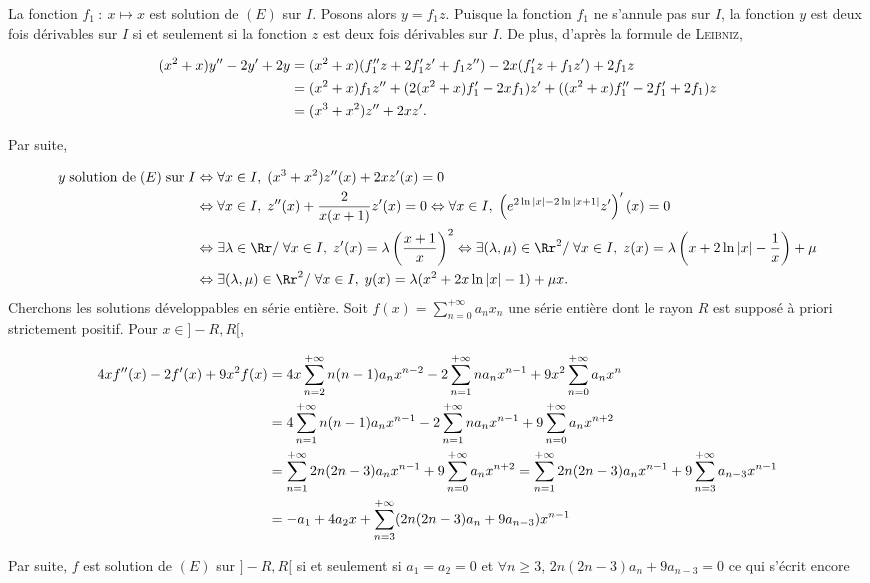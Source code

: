 {\begin{enumerate}
{La fonction $f_1~:~x\mapsto x$ est solution de $(E)$ sur $I$. Posons alors $y=f_1z$. Puisque la fonction $f_1$ ne s'annule pas sur $I$, la fonction $y$ est deux fois dérivables sur $I$ si et seulement si la fonction $z$ est deux fois dérivables sur $I$. De plus, d'après la formule de \textsc{Leibniz},

\begin{align*}\ensuremath
(x^2+x)y''-2y'+2y&=(x^2+x)(f_1''z+2f_1'z'+f_1z'')-2x(f_1'z+f_1z')+2f_1z\\
 &=(x^2+x)f_1z''+(2(x^2+x)f_1'-2xf_1)z'+((x^2+x)f_1''-2f_1'+2f_1)z\\
 &=(x^3+x^2)z''+2xz'.
\end{align*}

Par suite,

\begin{align*}\ensuremath
y\;\text{solution de}\;(E)\;\text{sur}\;I&\Leftrightarrow\forall x\in I,\;(x^3+x^2)z''(x)+2xz'(x)=0\\
 &\Leftrightarrow\forall x\in I,\;z''(x)+ \frac{2}{x(x+1)}z'(x)=0\Leftrightarrow\forall x\in I,\;\left(e^{2\ln|x|-2\ln|x+1|}z'\right)'(x)=0\\
  &\Leftrightarrow\exists\lambda\in\Rr/\;\forall x\in I,\;z'(x)=\lambda\left( \frac{x+1}{x}\right)^2\Leftrightarrow\exists(\lambda,\mu)\in\Rr^2/\;\forall x\in I,\;z(x)=\lambda\left(x+2\ln|x|- \frac{1}{x}\right)+\mu\\
  &\Leftrightarrow\exists(\lambda,\mu)\in\Rr^2/\;\forall x\in I,\;y(x)=\lambda(x^2+2x\ln|x|-1)+\mu x.
\end{align*}
Cherchons les solutions développables en série entière. Soit $f(x)=\sum_{n=0}^{+\infty}a_nx_n$ une série entière dont le rayon $R$ est supposé à priori strictement positif. Pour $x\in]-R,R[$,

\begin{align*}\ensuremath
4xf''(x)-2f'(x)+9x^2f(x)&=4x\sum_{n=2}^{+\infty}n(n-1)a_nx^{n-2}-2\sum_{n=1}^{+\infty}na_nx^{n-1}+9x^2\sum_{n=0}^{+\infty}a_nx^n\\
 &=4\sum_{n=1}^{+\infty}n(n-1)a_nx^{n-1}-2\sum_{n=1}^{+\infty}na_nx^{n-1}+9\sum_{n=0}^{+\infty}a_nx^{n+2}\\
  &=\sum_{n=1}^{+\infty}2n(2n-3)a_nx^{n-1}+9\sum_{n=0}^{+\infty}a_nx^{n+2}=\sum_{n=1}^{+\infty}2n(2n-3)a_nx^{n-1}+9\sum_{n=3}^{+\infty}a_{n-3}x^{n-1}\\
  &=-a_1+4a_2x+\sum_{n=3}^{+\infty}(2n(2n-3)a_n+9a_{n-3})x^{n-1}
\end{align*}

Par suite, $f$ est solution de $(E)$ sur $]-R,R[$ si et seulement si $a_1=a_2=0$ et $\forall n\geqslant3$, $2n(2n-3)a_n+9a_{n-3}=0$ ce qui s'écrit encore 

}
\end{enumerate}}
